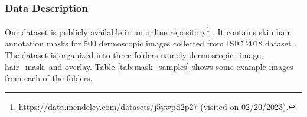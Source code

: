 \subsubsection{Data Description}
Our dataset is publicly available in an online repository\footnote{\url{https://data.mendeley.com/datasets/j5ywpd2p27} (visited on 02/20/2023).} \cite{Hossain2023}. It contains skin hair annotation masks for 500 dermoscopic images collected from ISIC 2018 dataset \cite{Codella2019}. The dataset is organized into three folders namely dermoscopic\_image, hair\_mask, and overlay. Table \ref{tab:mask_samples} shows some example images from each of the folders. 
\begin{table}[tbh!]
	\centering
	\caption{Samples from the prepared skin lesion hair mask dataset.}
	\label{tab:mask_samples}
\end{table}
